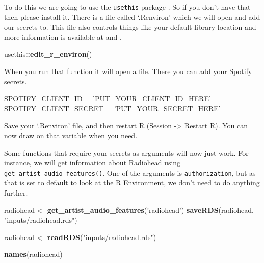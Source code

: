 \documentclass[
]{book}
\newenvironment{Shaded}{\begin{snugshade}}{\end{snugshade}}
\newcommand{\KeywordTok}[1]{\textcolor[rgb]{0.13,0.29,0.53}{\textbf{#1}}}
\newcommand{\NormalTok}[1]{#1}
\newcommand{\OperatorTok}[1]{\textcolor[rgb]{0.81,0.36,0.00}{\textbf{#1}}}
\newcommand{\StringTok}[1]{\textcolor[rgb]{0.31,0.60,0.02}{#1}}
\begin{document}
To do this we are going to use the \texttt{usethis} package \citet{citeusethis}. So if you don't have that then please install it. There is a file called `.Renviron' which we will open and add our secrets to. This file also controls things like your default library location and more information is available at \citet{renvironrstudio} and \citet{whattheyforgot}.

\begin{Shaded}
\begin{Highlighting}[]
\NormalTok{usethis}\OperatorTok{::}\KeywordTok{edit_r_environ}\NormalTok{() }
\end{Highlighting}
\end{Shaded}

When you run that function it will open a file. There you can add your Spotify secrets.

\begin{Shaded}
\begin{Highlighting}[]
\NormalTok{SPOTIFY_CLIENT_ID =}\StringTok{ 'PUT_YOUR_CLIENT_ID_HERE'}
\NormalTok{SPOTIFY_CLIENT_SECRET =}\StringTok{ 'PUT_YOUR_SECRET_HERE'}
\end{Highlighting}
\end{Shaded}

Save your `.Renviron' file, and then restart R (Session -\textgreater{} Restart R). You can now draw on that variable when you need.

Some functions that require your secrets as arguments will now just work. For instance, we will get information about Radiohead using \texttt{get\_artist\_audio\_features()}. One of the arguments is \texttt{authorization}, but as that is set to default to look at the R Environment, we don't need to do anything further.

\begin{Shaded}
\begin{Highlighting}[]
\NormalTok{radiohead <-}\StringTok{ }\KeywordTok{get_artist_audio_features}\NormalTok{(}\StringTok{'radiohead'}\NormalTok{)}
\KeywordTok{saveRDS}\NormalTok{(radiohead, }\StringTok{"inputs/radiohead.rds"}\NormalTok{)}
\end{Highlighting}
\end{Shaded}

\begin{Shaded}
\begin{Highlighting}[]
\NormalTok{radiohead <-}\StringTok{ }\KeywordTok{readRDS}\NormalTok{(}\StringTok{"inputs/radiohead.rds"}\NormalTok{)}

\KeywordTok{names}\NormalTok{(radiohead)}
\end{Highlighting}
\end{Shaded}
\end{document}
